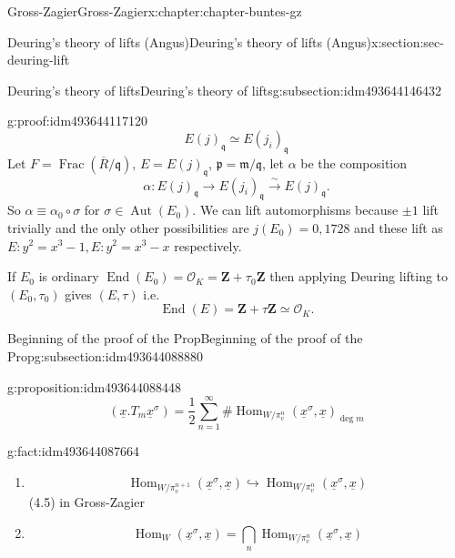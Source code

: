 \documentclass[oneside,10pt,]{book}
\numberwithin{equation}{section}
\newcommand{\ideal}[1]{\mathfrak{#1}}
\newcommand{\ZZ}{\mathbf{Z}}
\newcommand{\ints}{\mathcal{O}}
\DeclareMathOperator{\End}{End}
\DeclareMathOperator{\Hom}{Hom}
\DeclareMathOperator{\Aut}{Aut}
\DeclareMathOperator{\Frac}{Frac}
\begin{document}
\begin{chapterptx}{Gross-Zagier}{}{Gross-Zagier}{}{}{x:chapter:chapter-buntes-gz}
\begin{sectionptx}{Deuring's theory of lifts (Angus)}{}{Deuring's theory of lifts (Angus)}{}{}{x:section:sec-deuring-lift}
\begin{subsectionptx}{Deuring's theory of lifts}{}{Deuring's theory of lifts}{}{}{g:subsection:idm493644146432}
\begin{proofptx}{}{g:proof:idm493644117120}
\begin{equation*}
E(j)_{\ideal q} \simeq E(j_i)_{\ideal q}
\end{equation*}
Let \(F = \Frac (\overline R/\ideal q)\), \(E = E(j)_{\ideal q}\), \(\ideal p = \ideal m /\ideal q\), let \(\alpha \) be the composition%
\begin{equation*}
\alpha  \colon E(j)_{\ideal q} \to E(j_i)_{\ideal q} \xrightarrow\sim E(j)_{\ideal q}\text{.}
\end{equation*}
So \(\alpha  \equiv  \alpha _0 \circ \sigma\) for \(\sigma  \in \Aut(E_0)\). We can lift automorphisms because \(\pm1 \) lift trivially and the only other possibilities are \(j(E_0) = 0,1728\) and these lift as \(E\colon y^2 = x^3 - 1,E\colon y^2 = x^3-x\) respectively.%
\end{proofptx}
If \(E_0\) is ordinary \(\End(E_0) = \ints_K = \ZZ+ \tau _0\ZZ\) then applying Deuring lifting to \((E_0, \tau _0)\) gives \((E, \tau )\) i.e.%
\begin{equation*}
\End(E) = \ZZ+ \tau  \ZZ \simeq \ints_K\text{.}
\end{equation*}
%
\end{subsectionptx}
%
%
\typeout{************************************************}
\typeout{************************************************}
%
\begin{subsectionptx}{Beginning of the proof of the Prop}{}{Beginning of the proof of the Prop}{}{}{g:subsection:idm493644088880}
\begin{proposition}{}{}{g:proposition:idm493644088448}%
%
\begin{equation*}
(\underline x. T_m \underline x^\sigma ) = \frac12 \sum_{n=1}^\infty  \#\Hom_{W/\pi _v^n}(\underline x^\sigma , \underline x)_{\deg m}
\end{equation*}
%
\end{proposition}
\begin{fact}{}{}{g:fact:idm493644087664}%
%
\begin{enumerate}
\item{}%
\begin{equation*}
\Hom_{W/\pi _v^{n+1}}(\underline x^\sigma , \underline x) \hookrightarrow \Hom_{W/\pi _v^n}(\underline x^\sigma , \underline x)
\end{equation*}
(4.5) in Gross-Zagier%
\item{}%
\begin{equation*}
\Hom_{W}(\underline x^\sigma , \underline x) = \bigcap_n \Hom_{W/\pi _v^n}(\underline x^\sigma , \underline x)

\end{equation*}
\end{enumerate}
\end{fact}
\end{subsectionptx}
\end{sectionptx}
\end{chapterptx}
\end{document}
